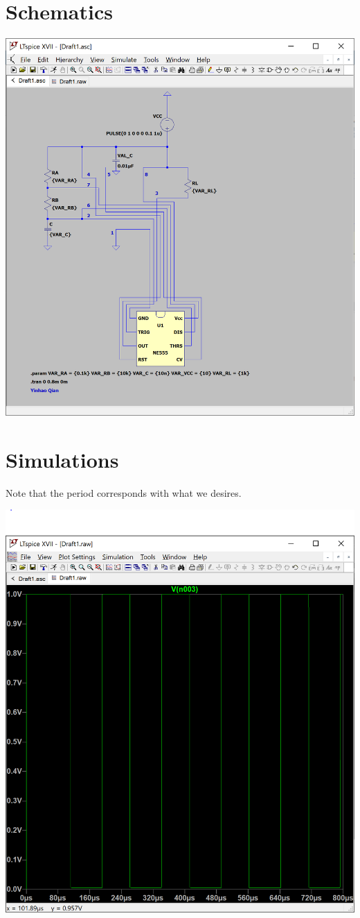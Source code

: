 \documentclass{article}
\begin{document}
	\section*{Schematics}
	\includegraphics[width=\columnwidth]{schmatics.PNG}
	\section*{Simulations}
	Note that the period corresponds with what we desires.
	
	\includegraphics[width=\columnwidth]{waveform.PNG}
	
\end{document}
